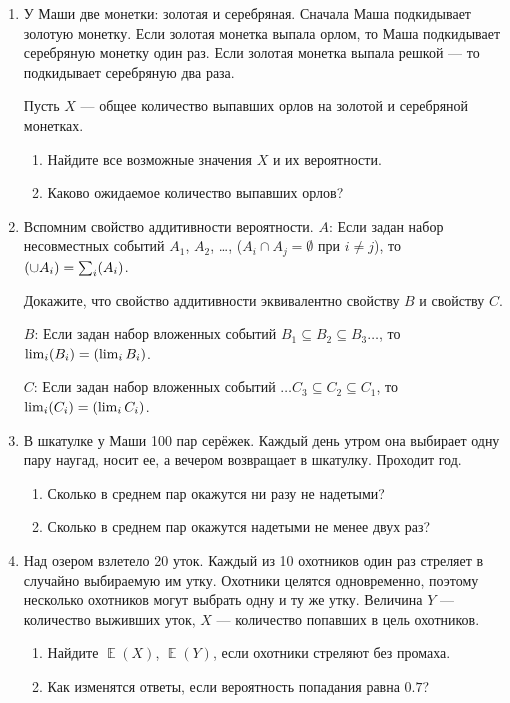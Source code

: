 \documentclass[12pt]{article}
\let\P\relax
\DeclareMathOperator{\P}{\mathbb{P}}
\DeclareMathOperator{\E}{\mathbb{E}}
\begin{document}
\begin{enumerate}[resume]
    \item У Маши две монетки: золотая и серебряная.
Сначала Маша подкидывает золотую монетку.
Если золотая монетка выпала орлом, то Маша подкидывает серебряную монетку один раз.
Если золотая монетка выпала решкой — то подкидывает серебряную два раза.

Пусть $X$ — общее количество выпавших орлов на золотой и серебряной монетках.

\begin{enumerate}
\item Найдите все возможные значения $X$ и их вероятности.
\item Каково ожидаемое количество выпавших орлов?
\end{enumerate}

    \item Вспомним свойство аддитивности вероятности. 
    $A$: Если задан набор несовместных событий $A_1$, $A_2$, \dots, ($A_i \cap A_j = \emptyset$ при $i\neq j$),
    то $\P(\cup A_i) = \sum_i \P(A_i)$.

    Докажите, что свойство аддитивности эквивалентно свойству $B$ и свойству $C$.

    $B$: Если задан набор вложенных событий $B_1 \subseteq B_2 \subseteq B_3 \dots$, то $\lim_i \P(B_i) = \P(\lim_i B_i)$.

    $C$: Если задан набор вложенных событий $\dots C_3 \subseteq C_2 \subseteq C_1$, то $\lim_i \P(C_i) = \P(\lim_i C_i)$.

    \item В шкатулке у Маши 100 пар серёжек. 
    Каждый день утром она выбирает одну пару наугад, носит ее, а вечером возвращает в шкатулку. 
    Проходит год.
    \begin{enumerate}
    \item Сколько в среднем пар окажутся ни разу не надетыми?
    \item Сколько в среднем пар окажутся надетыми не менее двух раз?
\end{enumerate}
    \item  Над озером взлетело 20 уток. 
    Каждый из 10 охотников один раз стреляет в случайно выбираемую им утку. 
    Охотники целятся одновременно, поэтому несколько охотников могут выбрать одну и ту же утку.
    Величина $Y$ — количество выживших уток, $X$ — количество попавших в цель охотников. 
   
   \begin{enumerate}
     \item Найдите $\E(X)$, $\E(Y)$, если охотники стреляют без промаха. 
     \item Как изменятся ответы, если вероятность попадания равна $0.7$?
   \end{enumerate}
   
\end{enumerate}
    
\end{document}
